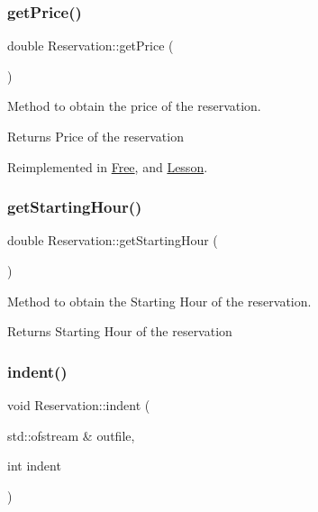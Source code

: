 \subsubsection{\texorpdfstring{get\+Price()}{getPrice()}}
{\footnotesize\ttfamily double Reservation\+::get\+Price (\begin{DoxyParamCaption}{ }\end{DoxyParamCaption})\hspace{0.3cm}{\ttfamily [virtual]}}



Method to obtain the price of the reservation. 

\begin{DoxyReturn}{Returns}
Price of the reservation 
\end{DoxyReturn}


Reimplemented in \mbox{\hyperlink{class_free_a229f009a7535eeba0a6ff4495de8c6bf}{Free}}, and \mbox{\hyperlink{class_lesson_ad7a2f708f870040627a442cdf000683f}{Lesson}}.

\mbox{\label{class_reservation_a28da7b16dadfeb33bf5351cabc8dbb0b}} 
\subsubsection{\texorpdfstring{get\+Starting\+Hour()}{getStartingHour()}}
{\footnotesize\ttfamily double Reservation\+::get\+Starting\+Hour (\begin{DoxyParamCaption}{ }\end{DoxyParamCaption})}



Method to obtain the Starting Hour of the reservation. 

\begin{DoxyReturn}{Returns}
Starting Hour of the reservation 
\end{DoxyReturn}
\mbox{\label{class_reservation_a480981ed050bae19bc74bbb0bbb459f9}} 
\subsubsection{\texorpdfstring{indent()}{indent()}}
{\footnotesize\ttfamily void Reservation\+::indent (\begin{DoxyParamCaption}\item[{std\+::ofstream \&}]{outfile,  }\item[{int}]{indent }\end{DoxyParamCaption})}




